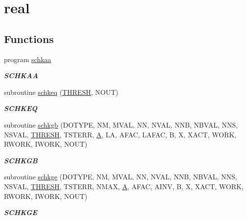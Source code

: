 \hypertarget{group__single__lin}{}\section{real}
\label{group__single__lin}
\subsection*{Functions}
\begin{DoxyCompactItemize}
\item 
program \hyperlink{group__single__lin_ga14d348e1e2f68acec6d8194588747cd8}{schkaa}
\begin{DoxyCompactList}\small\item\em {\bfseries S\+C\+H\+K\+A\+A} \end{DoxyCompactList}\item 
subroutine \hyperlink{group__single__lin_ga4c50dfbcd5bb4ce79a0cd9840bb0eab3}{schkeq} (\hyperlink{zlaqgs_8c_a0656018abfc9fa2821827415f5d5ea57}{T\+H\+R\+E\+S\+H}, N\+O\+U\+T)
\begin{DoxyCompactList}\small\item\em {\bfseries S\+C\+H\+K\+E\+Q} \end{DoxyCompactList}\item 
subroutine \hyperlink{group__single__lin_ga8666bb18d2e9148078a16c04319fa8e1}{schkgb} (D\+O\+T\+Y\+P\+E, N\+M, M\+V\+A\+L, N\+N, N\+V\+A\+L, N\+N\+B, N\+B\+V\+A\+L, N\+N\+S, N\+S\+V\+A\+L, \hyperlink{zlaqgs_8c_a0656018abfc9fa2821827415f5d5ea57}{T\+H\+R\+E\+S\+H}, T\+S\+T\+E\+R\+R, \hyperlink{classA}{A}, L\+A, A\+F\+A\+C, L\+A\+F\+A\+C, B, X, X\+A\+C\+T, W\+O\+R\+K, R\+W\+O\+R\+K, I\+W\+O\+R\+K, N\+O\+U\+T)
\begin{DoxyCompactList}\small\item\em {\bfseries S\+C\+H\+K\+G\+B} \end{DoxyCompactList}\item 
subroutine \hyperlink{group__single__lin_gac14b41fbcd75e726223589404833f2c1}{schkge} (D\+O\+T\+Y\+P\+E, N\+M, M\+V\+A\+L, N\+N, N\+V\+A\+L, N\+N\+B, N\+B\+V\+A\+L, N\+N\+S, N\+S\+V\+A\+L, \hyperlink{zlaqgs_8c_a0656018abfc9fa2821827415f5d5ea57}{T\+H\+R\+E\+S\+H}, T\+S\+T\+E\+R\+R, N\+M\+A\+X, \hyperlink{classA}{A}, A\+F\+A\+C, A\+I\+N\+V, B, X, X\+A\+C\+T, W\+O\+R\+K, R\+W\+O\+R\+K, I\+W\+O\+R\+K, N\+O\+U\+T)
\begin{DoxyCompactList}\small\item\em {\bfseries S\+C\+H\+K\+G\+E} \end{DoxyCompactList}\item 

\end{DoxyCompactItemize}
